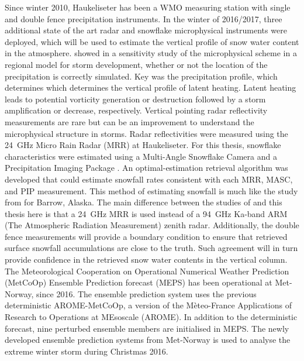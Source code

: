 \par\medskip
\noindent
Since winter 2010, Haukeliseter has been a WMO measuring station with single and double fence precipitation instruments. In the winter of 2016/2017, three additional state of the art radar and snowflake microphysical instruments were deployed, which will be used to estimate the vertical profile of snow water content in the atmosphere. \citet{joos_influence_2012} showed in a sensitivity study of the microphysical scheme in a regional model for storm development, whether or not the location of the precipitation is correctly simulated.
Key was the precipitation profile, which determines which determines the vertical profile of latent heating. Latent heating leads to potential vorticity generation or destruction followed by a storm amplification or decrease, respectively. Vertical pointing radar reflectivity measurements are rare but can be an improvement to understand the microphysical structure in storms. Radar reflectivities were measured using the \SI{24}{\giga\hertz} Micro Rain Radar (MRR) at Haukeliseter. For this thesis, snowflake characteristics were estimated using a Multi-Angle Snowflake Camera \citep[MASC;][]{garrett_fall_2012} and a Precipitation Imaging Package \citep[PIP;][]{newman_presenting_2009}. 
An optimal-estimation retrieval algorithm was developed that could estimate  snowfall rates consistent with each MRR, MASC, and PIP measurement. This method of estimating snowfall is much like the study from \citet{cooper_variational_2017} for Barrow, Alaska. The main difference between the studies of \citet{cooper_variational_2017} and this thesis here is that a \SI{24}{\giga\hertz} MRR is used instead of a \SI{94}{\giga\hertz} Ka-band ARM (The Atmospheric Radiation Measurement) zenith radar.
Additionally, the double fence measurements %
will provide a boundary condition to ensure that retrieved surface snowfall accumulations are close to the truth. Such agreement will in turn provide confidence in the retrieved snow water contents in the vertical column.
\\
The Meteorological Cooperation on Operational Numerical Weather Prediction (MetCoOp) Ensemble Prediction forecast (MEPS) has been operational at Met-Norway, since 2016. The ensemble prediction system uses the previous deterministic AROME-MetCoOp, a version of the Mèteo-France Applications of Research to Operations at MEsoscale (AROME). In addition to the deterministic forecast, nine perturbed ensemble members are initialised in MEPS. The newly developed ensemble prediction systems from Met-Norway is used to analyse the extreme winter storm during Christmas 2016. 
